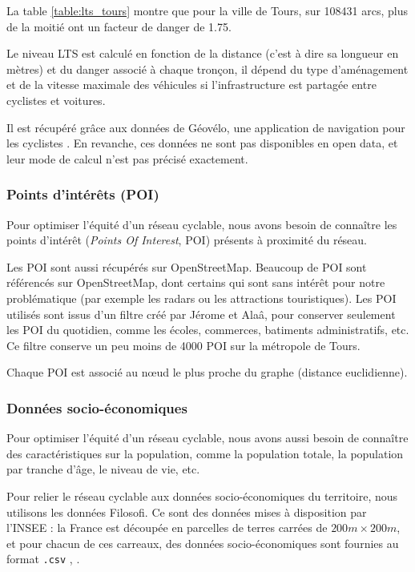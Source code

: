 La table \ref{table:lts_tours} montre que pour la ville de Tours, sur 108431 arcs, plus de la moitié ont un facteur de danger de 1.75. 

Le niveau LTS est calculé en fonction de la distance (c'est à dire sa longueur en mètres) et du danger associé à chaque tronçon, il dépend du type d'aménagement et de la vitesse maximale des véhicules si l'infrastructure est partagée entre cyclistes et voitures.

Il est récupéré grâce aux données de Géovélo, une application de navigation pour les cyclistes \cite{géovelo}. En revanche, ces données ne sont pas disponibles en open data, et leur mode de calcul n'est pas précisé exactement. 


\subsubsection{Points d'intérêts (POI)}\label{sect:poi}

Pour optimiser l'équité d'un réseau cyclable, nous avons besoin de connaître les points d'intérêt (\emph{Points Of Interest}, POI) présents à proximité du réseau. 

Les POI sont aussi récupérés sur OpenStreetMap. Beaucoup de POI sont référencés sur OpenStreetMap, dont certains qui sont sans intérêt pour notre problématique (par exemple les radars ou les attractions touristiques). Les POI utilisés sont issus d'un filtre créé par Jérome et Alaâ, pour conserver seulement les POI du quotidien, comme les écoles, commerces, batiments administratifs, etc. Ce filtre conserve un peu moins de 4000 POI sur la métropole de Tours.

Chaque POI est associé au nœud le plus proche du graphe (distance euclidienne). 

\subsubsection{Données socio-économiques}\label{sect:filo}

Pour optimiser l'équité d'un réseau cyclable, nous avons aussi besoin de connaître des caractéristiques sur la population, comme la population totale, la population par tranche d'âge, le niveau de vie, etc.

Pour relier le réseau cyclable aux données socio-économiques du territoire, nous utilisons les données Filosofi. Ce sont des données mises à disposition par l'INSEE : la France est découpée en parcelles de terres carrées de $200m \times 200m$, et pour chacun de ces carreaux, des données socio-économiques sont fournies au format \verb|.csv| \cite{filosofidonnees}, \cite{filosoficarte}.

